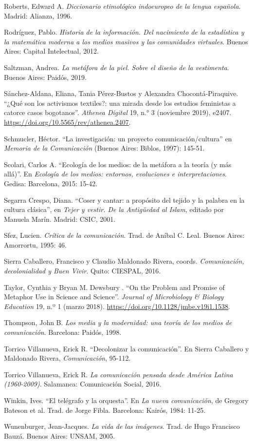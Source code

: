 \documentclass{tufte-handout}
\begin{document}
\begin{hangparas}{.25in}{1}
Roberts, Edward A. \emph{Diccionario etimológico indoeuropeo de la
lengua española}. Madrid: Alianza, 1996.

Rodríguez, Pablo. \emph{Historia de la información. Del nacimiento de la
estadística y la matemática moderna a los medios masivos y las
comunidades virtuales}. Buenos Aires: Capital Intelectual, 2012.

Saltzman, Andrea. \emph{La metáfora de la piel. Sobre el diseño de la
vestimenta}. Buenos Aires: Paidós, 2019.

Sánchez-Aldana, Eliana, Tania Pérez-Bustos y Alexandra
Chocontá-Piraquive. ``¿Qué son los activismos textiles?: una mirada
desde los estudios feministas a catorce casos bogotanos''. \emph{Athenea
Digital} 19, n.° 3 (noviembre 2019), e2407.
\url{https://doi.org/10.5565/rev/athenea.2407}.

Schmucler, Héctor. ``La investigación: un proyecto
comunicación/cultura'' en \emph{Memoria de la Comunicación} (Buenos
Aires: Biblos, 1997): 145-51.

Scolari, Carlos A. ``Ecología de los medios: de la metáfora a la teoría
(y más allá)''. En \emph{Ecología de los medios: entornos, evoluciones e
interpretaciones}. Gedisa: Barcelona, 2015: 15-42.

Segarra Crespo, Diana. ``Coser y cantar: a propósito del tejido y la
palabra en la cultura clásica'', en \emph{Tejer y vestir. De la
Antigüedad al Islam}, editado por Manuela Marín. Madrid: CSIC, 2001.

Sfez, Lucien. \emph{Crítica de la comunicación}. Trad. de Aníbal C.
Leal. Buenos Aires: Amorrortu, 1995: 46.

Sierra Caballero, Francisco y Claudio Maldonado Rivera, coords.
\emph{Comunicación, decolonialidad y Buen Vivir}. Quito: CIESPAL, 2016.

Taylor, Cynthia y Bryan M. Dewsbury . ``On the Problem and Promise of
Metaphor Use in Science and Science''. \emph{Journal of Microbiology \&
Biology Education} 19, n.º 1 (marzo 2018).
\url{https://doi.org/10.1128/jmbe.v19i1.1538}.

Thompson, John B. \emph{Los media y la modernidad: una teoría de los
medios de comunicación}. Barcelona: Paidós, 1998.

Torrico Villanueva, Erick R. ``Decolonizar la comunicación''. En Sierra
Caballero y Maldonado Rivera, \emph{Comunicación}, 95-112.

Torrico Villanueva, Erick R. \emph{La comunicación pensada desde América
Latina (1960-2009)}. Salamanca: Comunicación Social, 2016.

\pagebreak Winkin, Ives. ``El telégrafo y la orquesta''. En \emph{La nueva
comunicación}, de Gregory Bateson et al. Trad. de Jorge Fibla.
Barcelona: Kairós, 1984: 11-25.

Wunenburger, Jean-Jacques. \emph{La vida de las imágenes}. Trad. de Hugo
Francisco Bauzá. Buenos Aires: UNSAM, 2005.



\end{hangparas}
\end{document}
